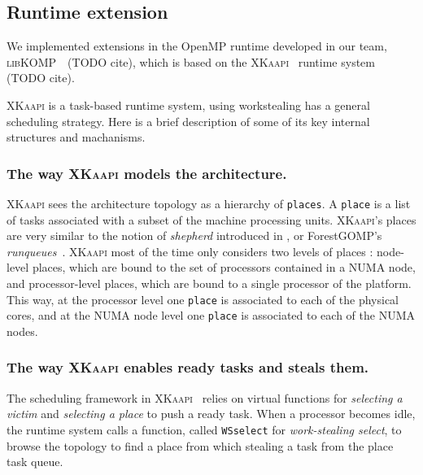 \documentclass{Styles/llncs}
\newcommand{\kaapi}{\textsc{\mbox{XKaapi}}\xspace}
\newcommand{\libXKOMP}{\textsc{libKOMP}\xspace}
\begin{document}
\subsection{Runtime extension}

We implemented extensions in the OpenMP runtime developed in our team, \libXKOMP~\cite{libkomp} (TODO cite),
which is based on the \kaapi~\cite{Bleuse2014} runtime system (TODO cite).

\kaapi is a task-based runtime system, using workstealing has a general scheduling strategy.
Here is a brief description of some of its key internal structures and machanisms.

\subsubsection{The way \kaapi models the architecture.}

\kaapi sees the architecture topology as a hierarchy of \verb/places/.
A \verb/place/ is a list of tasks associated with a subset of the machine processing units.
\kaapi's places are very similar to the notion of \emph{shepherd} introduced in \cite{DBLP:journals/ijhpca/OlivierPWSP12}, or ForestGOMP's \emph{runqueues}~\cite{BroFurGogWacNam10IJPP}.
\kaapi most of the time only considers two levels of places : node-level places,
which are bound to the set of processors contained in a NUMA node, and processor-level places, which are bound to a single processor of the platform.
This way, at the processor level one \verb/place/ is associated to each of the physical cores, and
at the NUMA node level one \verb/place/ is associated to each of the NUMA nodes.


\subsubsection{The way \kaapi enables ready tasks and steals them.}

The scheduling framework in \kaapi~\cite{Bleuse2014} relies on virtual functions
for \textit{selecting a victim} and \textit{selecting a place} to push a ready task.
When a processor becomes idle, the runtime system calls a function, called  \verb/WSselect/ for \emph{work-stealing select}, to browse the topology to find a place from which stealing a task from the place task queue.
\end{document}
